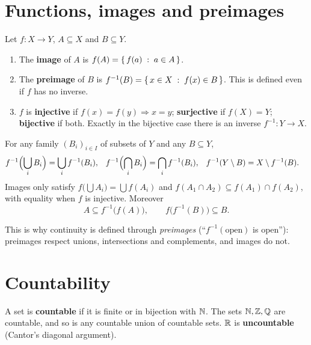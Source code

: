 \section{Functions, images and preimages}
\begin{definition}
Let $f\colon X\to Y$, $A\subseteq X$ and $B\subseteq Y$.
\begin{enumerate}[label=(\roman*)]
  \item The \textbf{image} of $A$ is $f(A)=\left\{\, f(a) \;:\; a\in A \,\right\}$.
  \item The \textbf{preimage} of $B$ is $f^{-1}(B)=\left\{\, x\in X \;:\; f(x)\in B \,\right\}$. This is defined even if $f$ has no inverse.
  \item $f$ is \textbf{injective} if $f(x)=f(y)\Rightarrow x=y$; \textbf{surjective} if $f(X)=Y$; \textbf{bijective} if both. Exactly in the bijective case there is an inverse $f^{-1}\colon Y\to X$.
\end{enumerate}
\end{definition}

\begin{proposition}\label{prop:preimage}
For any family $(B_i)_{i\in I}$ of subsets of $Y$ and any $B\subseteq Y$,
\begin{align*}
  f^{-1}\Bigl(\bigcup_{i} B_i\Bigr) &= \bigcup_{i} f^{-1}(B_i), &
  f^{-1}\Bigl(\bigcap_{i} B_i\Bigr) &= \bigcap_{i} f^{-1}(B_i), &
  f^{-1}(Y\setminus B) &= X\setminus f^{-1}(B).
\end{align*}
Images only satisfy $f\bigl(\bigcup A_i\bigr)=\bigcup f(A_i)$ and $f(A_1\cap A_2)\subseteq f(A_1)\cap f(A_2)$, with equality when $f$ is injective. Moreover
\[
  A\subseteq f^{-1}\bigl(f(A)\bigr), \qquad f\bigl(f^{-1}(B)\bigr)\subseteq B .
\]
\end{proposition}

\begin{remark}
This is why continuity is defined through \emph{preimages} (``$f^{-1}(\text{open})$ is open''): preimages respect unions, intersections and complements, and images do not.
\end{remark}

\section{Countability}
A set is \textbf{countable} if it is finite or in bijection with $\mathbb{N}$. The sets $\mathbb{N},\mathbb{Z},\mathbb{Q}$ are countable, and so is any countable union of countable sets. $\mathbb{R}$ is \textbf{uncountable} (Cantor's diagonal argument).

